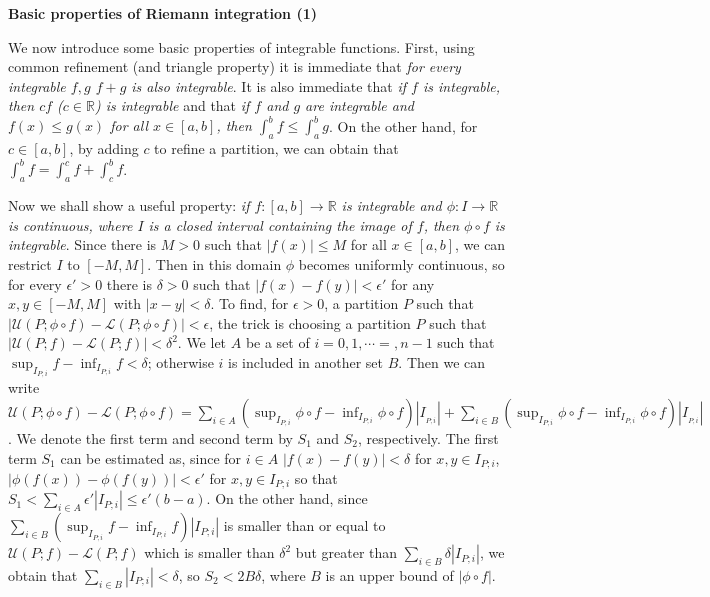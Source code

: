 \documentclass{article}
\newcommand{\ReR}{\mathbb{R}}
\begin{document}
\newpage

\textbf{Basic properties of Riemann integration (1)}

We now introduce some basic properties of integrable functions.
First, using common refinement (and triangle property) it is immediate that \textit{for every integrable $f, g$ $f + g$ is also integrable}.
It is also immediate that \textit{if $f$ is integrable, then $cf$ ($c \in \ReR$) is integrable} and that \textit{if $f$ and $g$ are integrable and $f(x) \le g(x)$ for all $x \in [a, b]$, then $\int_a^b f \le \int_a^b g$}.
On the other hand, for $c \in [a, b]$, by adding $c$ to refine a partition, we can obtain that \textit{$\int_a^b f = \int_a^c f + \int_c^b f$}.

Now we shall show a useful property: \textit{if $f : [a, b] \to \ReR$ is integrable and $\phi : I \to \ReR$ is continuous, where $I$ is a closed interval containing the image of $f$, then $\phi \circ f$ is integrable}.
Since there is $M > 0$ such that $|f(x)| \le M$ for all $x \in [a, b]$, we can restrict $I$ to $[-M, M]$.
Then in this domain $\phi$ becomes uniformly continuous, so for every $\epsilon' > 0$ there is $\delta > 0$ such that $|f(x) - f(y)| < \epsilon'$ for any $x, y \in [-M, M]$ with $|x - y| < \delta$.
To find, for $\epsilon > 0$, a partition $P$ such that $|\mathcal{U}(P; \phi \circ f) - \mathcal{L}(P; \phi \circ f)| < \epsilon$, the trick is choosing a partition $P$ such that $|\mathcal{U}(P; f) - \mathcal{L}(P; f)| < \delta^2$.
We let $A$ be a set of $i = 0, 1, \cdots =, n - 1$ such that $\sup_{I_{P;i}} f - \inf_{I_{P; i}} f < \delta$; otherwise $i$ is included in another set $B$.
Then we can write $\mathcal{U}(P; \phi \circ f) - \mathcal{L}(P; \phi \circ f) = \sum_{i \in A} (\sup_{I_{P;i}} \phi \circ f - \inf_{I_{P;i}} \phi \circ f) |I_{_{P;i}}| + \sum_{i \in B} (\sup_{I_{P;i}} \phi \circ f - \inf_{I_{P;i}} \phi \circ f) |I_{_{P;i}}|$.
We denote the first term and second term by $S_1$ and $S_2$, respectively.
The first term $S_1$ can be estimated as, since for $i \in A$ $|f(x) - f(y)| < \delta$ for $x, y \in I_{P;i}$, $|\phi(f(x)) - \phi(f(y))| < \epsilon'$ for $x, y \in I_{P;i}$ so that $S_1 < \sum_{i \in A} \epsilon' |I_{P;i}| \le \epsilon' (b - a)$.
On the other hand, since $\sum_{i \in B} (\sup_{I_{P;i}} f - \inf_{I_{P;i}} f) |I_{P;i}|$ is smaller than or equal to $\mathcal{U}(P; f) - \mathcal{L}(P; f)$ which is smaller than $\delta^2$ but greater than $\sum_{i \in B} \delta |I_{P;i}|$, we obtain that $\sum_{i \in B} |I_{P;i}| < \delta$, so $S_2 < 2B \delta$, where $B$ is an upper bound of $|\phi \circ f|$.
\end{document}
